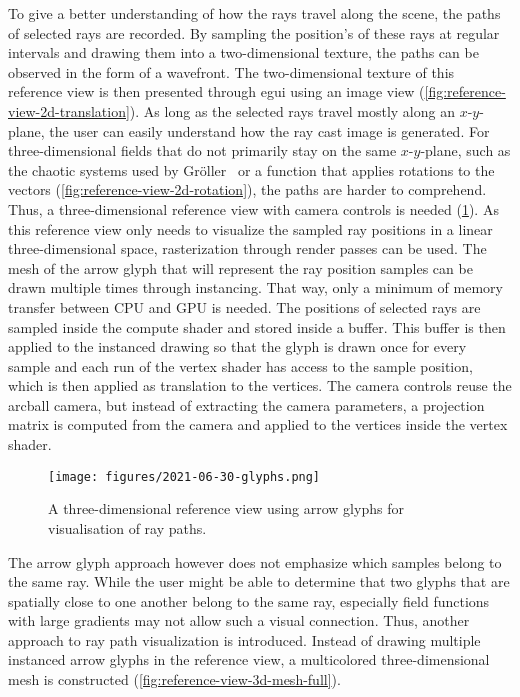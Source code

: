 To give a better understanding of how the rays travel along the scene, the paths of selected rays are recorded.
By sampling the position's of these rays at regular intervals and drawing them into a two-dimensional texture, the paths can be observed in the form of a wavefront.
The two-dimensional texture of this reference view is then presented through egui using an image view (\cref{fig:reference-view-2d-translation}).
As long as the selected rays travel mostly along an $x$-$y$-plane, the user can easily understand how the ray cast image is generated.
For three-dimensional fields that do not primarily stay on the same $x$-$y$-plane, such as the chaotic systems used by Gröller~\cite{grollerNonlinearRayTracing1995} or a function that applies rotations to the vectors (\cref{fig:reference-view-2d-rotation}), the paths are harder to comprehend.
Thus, a three-dimensional reference view with camera controls is needed (\cref{fig:ray-arrow-glyphs}).
As this reference view only needs to visualize the sampled ray positions in a linear three-dimensional space, rasterization through render passes can be used.
The mesh of the arrow glyph that will represent the ray position samples can be drawn multiple times through instancing.
That way, only a minimum of memory transfer between CPU and GPU is needed.
The positions of selected rays are sampled inside the compute shader and stored inside a buffer.
This buffer is then applied to the instanced drawing so that the glyph is drawn once for every sample and each run of the vertex shader has access to the sample position, which is then applied as translation to the vertices.
The camera controls reuse the arcball camera, but instead of extracting the camera parameters, a projection matrix is computed from the camera and applied to the vertices inside the vertex shader.
\begin{figure}[!t]
  \centering
  \texttt{[image: figures/2021-06-30-glyphs.png]}
  \caption{A three-dimensional reference view using arrow glyphs for visualisation of ray paths.}
  \label{fig:ray-arrow-glyphs}
\end{figure}
The arrow glyph approach however does not emphasize which samples belong to the same ray.
While the user might be able to determine that two glyphs that are spatially close to one another belong to the same ray, especially field functions with large gradients may not allow such a visual connection.
Thus, another approach to ray path visualization is introduced.
Instead of drawing multiple instanced arrow glyphs in the reference view, a multicolored three-dimensional mesh is constructed (\cref{fig:reference-view-3d-mesh-full}).
